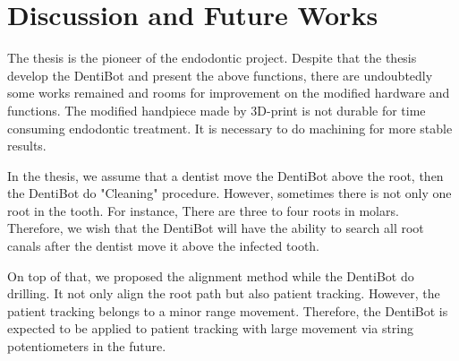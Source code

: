 \section{Discussion and Future Works}
\hspace*{6mm}The thesis is the pioneer of the endodontic project. Despite that the thesis develop the DentiBot and present the above functions, there are undoubtedly some works remained and rooms for improvement on the modified hardware and functions. The modified handpiece made by 3D-print is not durable for time consuming endodontic treatment. It is necessary to do machining for more stable results. 
\par 
In the thesis, we assume that a dentist move the DentiBot above the root, then the DentiBot do "Cleaning" procedure. However, sometimes there is not only one root in the tooth. For instance, There are three to four roots in molars. Therefore, we wish that the DentiBot will have the ability to search all root canals after the dentist move it above the infected tooth. 
\par
On top of that, we proposed the alignment method while the DentiBot do drilling. It not only align the root path but also patient tracking. However, the patient tracking belongs to a minor range movement. Therefore, the DentiBot is expected to be applied to patient tracking with large movement via string potentiometers in the future.			